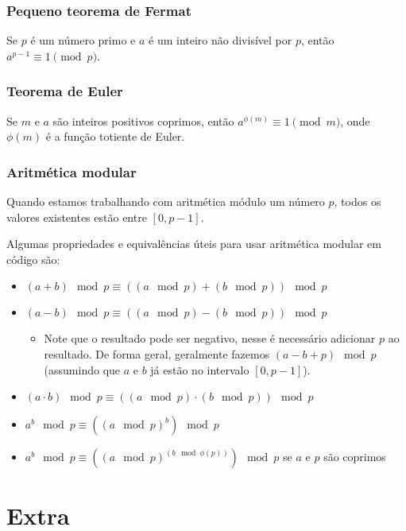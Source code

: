 \documentclass[10pt, a4paper, oneside]{book}
\begin{document}
\subsection{Pequeno teorema de Fermat}

Se $p$ é um número primo e $a$ é um inteiro não divisível por $p$, então $a^{p-1} \equiv 1 \pmod{p}$.

\subsection{Teorema de Euler}

Se $m$ e $a$ são inteiros positivos coprimos, então $a^{\phi(m)} \equiv 1 \pmod{m}$, onde $\phi(m)$ é a função totiente de Euler.

\subsection{Aritmética modular}

Quando estamos trabalhando com aritmética módulo um número $p$, todos os valores existentes estão entre $[0, p-1]$. 

Algumas propriedades e equivalências úteis para usar aritmética modular em código são:

\begin{itemize}
  \item $(a + b) \mod p \equiv ((a \mod p) + (b \mod p)) \mod p$
  \item $(a - b) \mod p \equiv ((a \mod p) - (b \mod p)) \mod p$
  \begin{itemize}
    \item Note que o resultado pode ser negativo, nesse é necessário adicionar $p$ ao resultado. De forma geral, geralmente fazemos $(a - b + p) \mod p$ (assumindo que $a$ e $b$ já estão no intervalo $[0, p-1]$).
  \end{itemize}
  \item $(a \cdot b) \mod p \equiv ((a \mod p) \cdot (b \mod p)) \mod p$
  \item $a^b \mod p \equiv ((a \mod p)^b) \mod p$
  \item $a^b \mod p \equiv ((a \mod p)^{(b \mod \phi(p))}) \mod p$ se $a$ e $p$ são coprimos
\end{itemize}
\newpage

%
%
%
%

\chapter{Extra}
\end{document}
